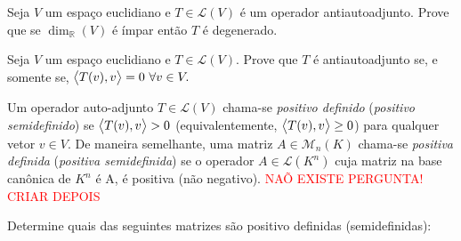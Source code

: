 \documentclass[11pt,a4paper]{article}
\begin{document}
\begin{exercicio}
Seja $V$ um espaço euclidiano e $T \in \mathcal{L}(V)$ é um operador antiautoadjunto. Prove que se $\dim_{\mathbb{R}}(V)$ é ímpar então $T$ é degenerado.
\end{exercicio}

\begin{exercicio}
Seja $V$ um espaço euclidiano e $T \in \mathcal{L}(V).$ Prove que $T$ é antiautoadjunto se, e somente se, $\left\langle T(v), v \right\rangle = 0 \ \forall v \in V.$
\end{exercicio}
\solucao{}

\begin{exercicio}
Um operador auto-adjunto $T \in \mathcal{L}(V)$ chama-se \emph{positivo definido} (\emph{positivo semidefinido}) se $\left\langle T(v), v \right\rangle > 0$ (equivalentemente, $\left\langle T(v), v \right\rangle \ge 0$) para qualquer vetor $v \in V.$ De maneira semelhante, uma matriz $A \in \mathcal{M}_n(K)$ chama-se \emph{positiva definida} (\emph{positiva semidefinida}) se o operador $A \in \mathcal{L}(K^n)$ cuja matriz na base canônica de $K^n$
é A, é positiva (não negativo).
\textcolor{Red}{NAÕ EXISTE PERGUNTA! CRIAR DEPOIS}
\end{exercicio}
\solucao{}
\begin{exercicio} Determine quais das seguintes matrizes são positivo definidas (semidefinidas):
\end{exercicio}
\end{document}
